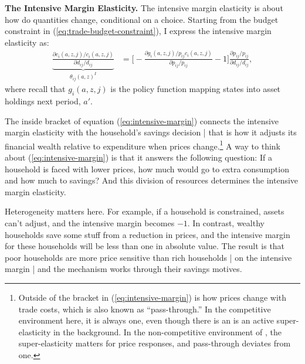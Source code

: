 \documentclass[12pt,pdftex]{article}
\begin{document}
\begin{onehalfspacing}
\textbf{The Intensive Margin Elasticity.} The intensive margin elasticity is about how do quantities change, conditional on a choice. Starting from the budget constraint in (\ref{eq:trade-budget-constraint}), I express the intensive margin elasticity as:
\begin{align}
\underbrace{\frac{\partial c_{i}(a,z,j)/ c_{i}(a,z,j)}{\partial d_{ij} / d_{ij}}}_{\theta_{ij}(a,z)^{I}} &= \bigg [-\frac{\partial g_{i}(a,z,j)/ p_{ij}c_{i}(a,z,j)}{\partial p_{ij}/ p_{ij}} - 1 \bigg ]\frac{\partial p_{ij}/p_{ij}}{\partial d_{ij}/ d_{ij}} ,
\label{eq:intensive-margin}
\end{align}
where recall that $g_{i}(a,z,j)$ is the policy function mapping states into asset holdings next period, $a'$.

The inside bracket of equation (\ref{eq:intensive-margin}) connects the intensive margin elasticity with the household's savings decision | that is how it adjusts its financial wealth relative to expenditure when prices change.\footnote{Outside of the bracket in (\ref{eq:intensive-margin}) is how prices change with trade costs, which is also known as ``pass-through.'' In the competitive environment here, it is always one, even though there is an is an active super-elasticity in the background. In the non-competitive environment of \citet{p-iq}, the super-elasticity matters for price responses, and pass-through deviates from one.} A way to think about (\ref{eq:intensive-margin}) is that it answers the following question: If a household is faced with lower prices, how much would go to extra consumption and how much to savings? And this division of resources determines the intensive margin elasticity.

Heterogeneity matters here. For example, if a household is constrained, assets can't adjust, and the intensive margin becomes $-1$. In contrast, wealthy households save some stuff from a reduction in prices, and the intensive margin for these households will be less than one in absolute value. The result is that poor households are more price sensitive than rich households | on the intensive margin | and the mechanism works through their savings motives.


\end{onehalfspacing}
\end{document}

